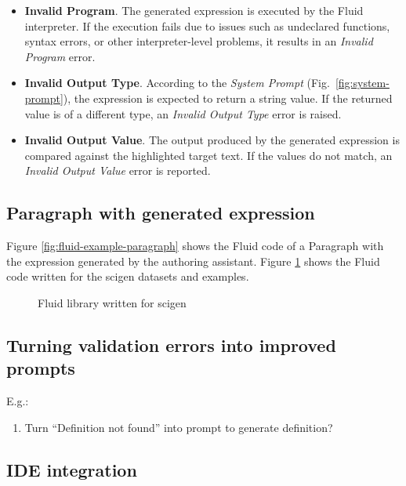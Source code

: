 \begin{itemize}
    \item \textbf{Invalid Program}.
    The generated expression is executed by the Fluid interpreter.
    If the execution fails due to issues such as undeclared functions, syntax errors, or other interpreter-level problems, it results in an \textit{Invalid Program} error.
    \item \textbf{Invalid Output Type}.
    According to the \textit{System Prompt} (Fig.~\ref{fig:system-prompt}), the expression is expected to return a string value.
    If the returned value is of a different type, an \textit{Invalid Output Type} error is raised.
    \item \textbf{Invalid Output Value}.
    The output produced by the generated expression is compared against the highlighted target text.
    If the values do not match, an \textit{Invalid Output Value} error is reported.
\end{itemize}

\subsection{Paragraph with generated expression}
\label{subsec:paragraph-with-generated-expression}
Figure \ref{fig:fluid-example-paragraph} shows the Fluid code of a Paragraph with the expression generated by the authoring assistant.
Figure \ref{fig:fluid-scigen} shows the Fluid code written for the scigen datasets and examples.



\begin{figure}[h]
    \small
    {}
    \caption{Fluid library written for scigen}
    \label{fig:fluid-scigen}
\end{figure}

\subsection{Turning validation errors into improved prompts}\label{subsec:turning-validation-errors-into-improved-prompts}
E.g.:
\begin{enumerate}
\item Turn ``Definition not found'' into prompt to generate definition?
\end{enumerate}

\subsection{IDE integration}\label{subsec:ide-integration}

